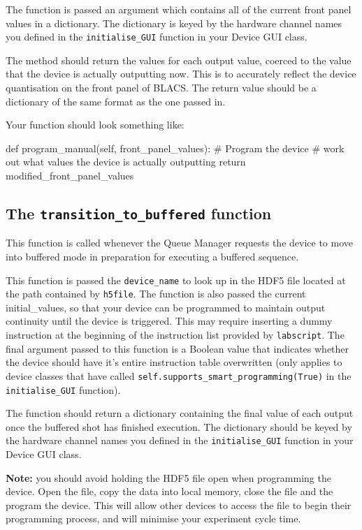 \documentclass[12pt]{article}
\begin{document}
The function is passed an argument which contains all of the current front panel values in a dictionary.
The dictionary is keyed by the hardware channel names you defined in the \texttt{initialise\_GUI} function in your Device GUI class.

The method should return the values for each output value, coerced to the value that the device is actually outputting now.
This is to accurately reflect the device quantisation on the front panel of BLACS.
The return value should be a dictionary of the same format as the one passed in.

Your function should look something like:
\begin{python}
    def program_manual(self, front_panel_values):
        # Program the device
        # work out what values the device is actually outputting
        return modified_front_panel_values
\end{python}



\subsection{The \texttt{transition\_to\_buffered} function}
This function is called whenever the Queue Manager requests the device to move into buffered mode in preparation for executing a buffered sequence.

This function is passed the \texttt{device\_name} to look up in the HDF5 file located at the path contained by \texttt{h5file}.
The function is also passed the current initial\_values, so that your device can be programmed to maintain output continuity until the device is triggered.
This may require inserting a dummy instruction at the beginning of the instruction list provided by \texttt{labscript}.
The final argument passed to this function is a Boolean value that indicates whether the device should have it's entire instruction table overwritten (only applies to device classes that have called \texttt{self.supports\_smart\_programming(True)} in the \texttt{initialise\_GUI} function).

The function should return a dictionary containing the final value of each output once the buffered shot has finished execution.
The dictionary should be keyed by the hardware channel names you defined in the \texttt{initialise\_GUI} function in your Device GUI class.

\textbf{Note:} you should avoid holding the HDF5 file open when programming the device. Open the file, copy the data into local memory, close the file and the program the device.
This will allow other devices to access the file to begin their programming process, and will minimise your experiment cycle time.
\end{document}
